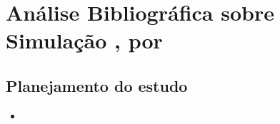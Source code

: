 \chapter{Análise Bibliográfica sobre Simulação , por }%


\section{Planejamento do estudo}


\begin{itemize}
    \item 
\end{itemize}
